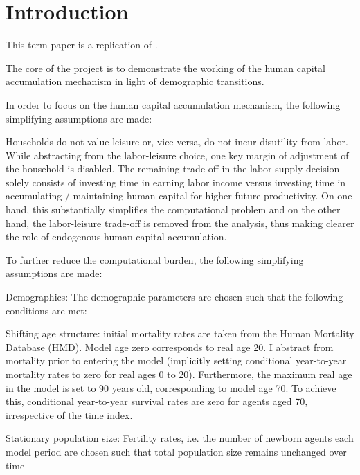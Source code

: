 \section{Introduction} %
\label{sec:introduction}

This term paper is a replication of \cite{LudwigSchelkleVogel2016}.

The core of the project is to demonstrate the working of the human capital accumulation mechanism in light of demographic transitions.

In order to focus on the human capital accumulation mechanism, the following simplifying assumptions are made:

Households do not value leisure or, vice versa, do not incur disutility from labor. While abstracting from the labor-leisure choice, one key margin of adjustment of the household is disabled. The remaining trade-off in the labor supply decision solely consists of investing time in earning labor income versus investing time in accumulating / maintaining human capital for higher future productivity. On one hand, this substantially simplifies the computational problem and on the other hand, the labor-leisure trade-off is removed from the analysis, thus making clearer the role of endogenous human capital accumulation.



To further reduce the computational burden, the following simplifying assumptions are made:


Demographics:
The demographic parameters are chosen such that the following conditions are met:


Shifting age structure:
    initial mortality rates are taken from the Human Mortality Database (HMD). Model age zero corresponds to real age 20. I abstract from mortality prior to entering the model (implicitly setting conditional year-to-year mortality rates to zero for real ages 0 to 20). Furthermore, the maximum real age in the model is set to 90 years old, corresponding to model age 70. To achieve this, conditional year-to-year survival rates are zero for agents aged 70, irrespective of the time index.

Stationary population size: Fertility rates, i.e. the number of newborn agents each model period are chosen such that total population size remains unchanged over time